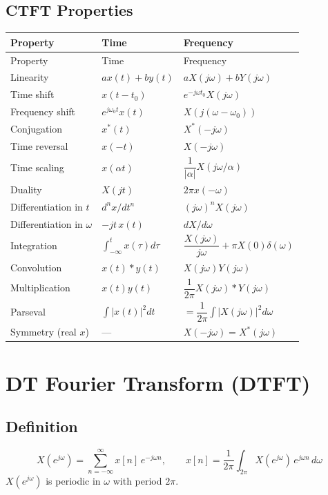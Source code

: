 \documentclass[10pt]{article}
\begin{document}
\subsection{CTFT Properties}
\begin{longtable}{@{}lll@{}}
\toprule Property & Time & Frequency \\ \midrule \endfirsthead
\toprule Property & Time & Frequency \\ \midrule \endhead
\bottomrule \endfoot
Linearity & $ax(t) + by(t)$ & $aX(j\omega) + bY(j\omega)$ \\
Time shift & $x(t - t_0)$ & $e^{-j\omega t_0} X(j\omega)$ \\
Frequency shift & $e^{j\omega_0 t} x(t)$ & $X(j(\omega - \omega_0))$ \\
Conjugation & $x^*(t)$ & $X^*(-j\omega)$ \\
Time reversal & $x(-t)$ & $X(-j\omega)$ \\
Time scaling & $x(\alpha t)$ & $\dfrac{1}{|\alpha|}X(j\omega/\alpha)$ \\
Duality & $X(jt)$ & $2\pi x(-\omega)$ \\
Differentiation in $t$ & $d^n x/dt^n$ & $(j\omega)^n X(j\omega)$ \\
Differentiation in $\omega$ & $-jt\, x(t)$ & $dX/d\omega$ \\
Integration & $\int_{-\infty}^t x(\tau)d\tau$ & $\dfrac{X(j\omega)}{j\omega} + \pi X(0)\delta(\omega)$ \\
Convolution & $x(t) * y(t)$ & $X(j\omega)Y(j\omega)$ \\
Multiplication & $x(t) y(t)$ & $\dfrac{1}{2\pi} X(j\omega) * Y(j\omega)$ \\
Parseval & $\int |x(t)|^2 dt$ & $= \dfrac{1}{2\pi}\int |X(j\omega)|^2 d\omega$ \\
Symmetry (real $x$) & --- & $X(-j\omega) = X^*(j\omega)$ \\
\end{longtable}

\section{DT Fourier Transform (DTFT)}

\subsection{Definition}
\[
X(e^{j\omega}) = \sum_{n=-\infty}^{\infty} x[n]\,e^{-j\omega n},\qquad
x[n] = \frac{1}{2\pi}\int_{2\pi} X(e^{j\omega})\,e^{j\omega n}\,d\omega
\]
$X(e^{j\omega})$ is periodic in $\omega$ with period $2\pi$.
\end{document}
